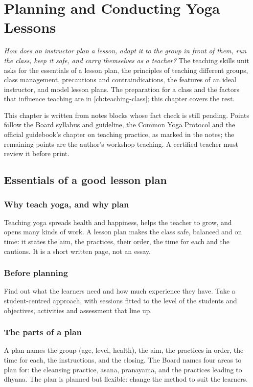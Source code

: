 \chapter{Planning and Conducting Yoga Lessons}
\label{ch:lessons}

\emph{How does an instructor plan a lesson, adapt it to the group in front of them, run the class, keep it safe, and carry themselves as a teacher?}
The teaching skills unit asks for the essentials of a lesson plan, the principles of teaching different groups, class management, precautions and contraindications, the features of an ideal instructor, and model lesson plans. The preparation for a class and the factors that influence teaching are in \cref{ch:teaching-class}; this chapter covers the rest.

\begin{unverified}
This chapter is written from notes blocks whose fact check is still pending. Points follow the Board syllabus and guideline, the Common Yoga Protocol and the official guidebook's chapter on teaching practice, as marked in the notes; the remaining points are the author's workshop teaching. A certified teacher must review it before print.
\end{unverified}

\section{Essentials of a good lesson plan}

\subsection*{Why teach yoga, and why plan}
Teaching yoga spreads health and happiness, helps the teacher to grow, and opens many kinds of work. A lesson plan makes the class safe, balanced and on time: it states the aim, the practices, their order, the time for each and the cautions. It is a short written page, not an essay.

\subsection*{Before planning}
Find out what the learners need and how much experience they have. Take a student-centred approach, with sessions fitted to the level of the students and objectives, activities and assessment that line up.

\subsection*{The parts of a plan}
A plan names the group (age, level, health), the aim, the practices in order, the time for each, the instructions, and the closing. The Board names four areas to plan for: the cleansing practice, asana, pranayama, and the practices leading to dhyana. The plan is planned but flexible: change the method to suit the learners.

